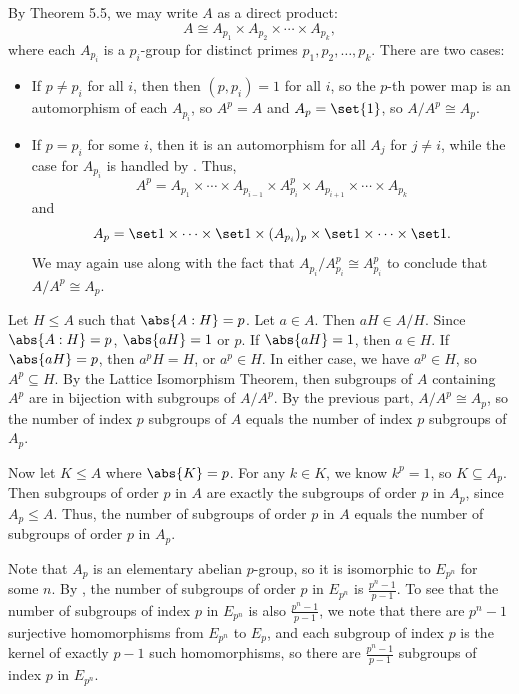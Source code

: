 \begin{solenum}
    \item By Theorem 5.5, we may write $A$ as a direct product:
    \[
    	A \cong A_{p_1} \times A_{p_2} \times \cdots \times A_{p_k},
    \]
    where each $A_{p_i}$ is a $p_i$-group for distinct primes $p_1, p_2, \ldots, p_k$.
	There are two cases:
    \begin{itemize}
        \item If $p \neq p_i$ for all $i$, then then $(p, p_i) = 1$ for all $i$, so the $p$-th power map is an automorphism of each $A_{p_i}$, so $A^p = A$ and $A_p = \set{1}$, so $A/A^p \cong A_p$.
        \item If $p = p_i$ for some $i$, then it is an automorphism for all $A_j$ for $j \neq i$, while the case for $A_{p_i}$ is handled by .
	Thus,
        \[
        	A^p = A_{p_1} \times \cdots \times A_{p_{i-1}} \times A_{p_i}^p \times A_{p_{i+1}} \times \cdots \times A_{p_k}
        \]
        and
        \[
        	A_p = \set 1 \times \cdots \times \set 1 \times (A_{p_i})_p \times \set 1 \times \cdots \times \set 1.
        \]
        We may again use  along with the fact that $A_{p_i} / A_{p_i}^p \cong A_{p_i}^p$ to conclude that $A/A^p \cong A_p$.
    \end{itemize}
    \item Let $H \leq A$ such that $\abs{A : H} = p$.
	Let $a \in A$.
	Then $aH \in A/H$.
	Since $\abs{A : H} = p$, $\abs{aH} = 1$ or $p$.
	If $\abs{aH} = 1$, then $a \in H$.
	If $\abs{aH} = p$, then $a^pH = H$, or $a^p \in H$.
	In either case, we have $a^p \in H$, so $A^p \subseteq H$.
	By the Lattice Isomorphism Theorem, then subgroups of $A$ containing $A^p$ are in bijection with subgroups of $A/A^p$.
	By the previous part, $A/A^p \cong A_p$, so the number of index $p$ subgroups of $A$ equals the number of index $p$ subgroups of $A_p$.
    
    Now let $K \leq A$ where $\abs{K} = p$.
	For any $k \in K$, we know $k^p = 1$, so $K \subseteq A_p$.
	Then subgroups of order $p$ in $A$ are exactly the subgroups of order $p$ in $A_p$, since $A_p \leq A$.
	Thus, the number of subgroups of order $p$ in $A$ equals the number of subgroups of order $p$ in $A_p$.

    Note that $A_p$ is an elementary abelian $p$-group, so it is isomorphic to $E_{p^n}$ for some $n$.
	By , the number of subgroups of order $p$ in $E_{p^n}$ is $\frac{p^n - 1}{p - 1}$.
	To see that the number of subgroups of index $p$ in $E_{p^n}$ is also $\frac{p^n - 1}{p - 1}$, we note that there are $p^n - 1$ surjective homomorphisms from $E_{p^n}$ to $E_p$, and each subgroup of index $p$ is the kernel of exactly $p - 1$ such homomorphisms, so there are $\frac{p^n - 1}{p - 1}$ subgroups of index $p$ in $E_{p^n}$.
\end{solenum}

